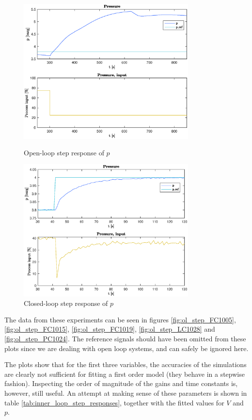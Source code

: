 \documentclass[12pt]{article}
\begin{document}
\begin{figure}
\centering
\includegraphics[width=0.8\textwidth]{../Systemanalyse/Log_Data_to_Matlab/Figurer/Stegeksperimenter/PC1024.eps}
\caption{Open-loop step response of $p$}
\label{fig:ol_step_PC1024}

\includegraphics[width=0.8\textwidth]{../Systemanalyse/Log_Data_to_Matlab/Figurer/Stegeksperimenter/PC1024_step.eps}
\caption{Closed-loop step response of $p$}
\label{fig:cl_step_PC1024}
\end{figure}

The data from these experiments can be seen in figures \ref{fig:ol_step_FC1005}, \ref{fig:ol_step_FC1015}, \ref{fig:ol_step_FC1019}, \ref{fig:ol_step_LC1028} and \ref{fig:ol_step_PC1024}. The reference signals should have been omitted from these plots since we are dealing with open loop systems, and can safely be ignored here.

The plots show that for the first three variables, the accuracies of the simulations are clearly not sufficient for fitting a first order model (they behave in a stepwise fashion). Inspecting the order of magnitude of the gains and time constants is, however, still useful. An attempt at making sense of these parameters is shown in table \ref{tab:inner_loop_step_responses}, together with the fitted values for $V$ and $p$.
\end{document}
